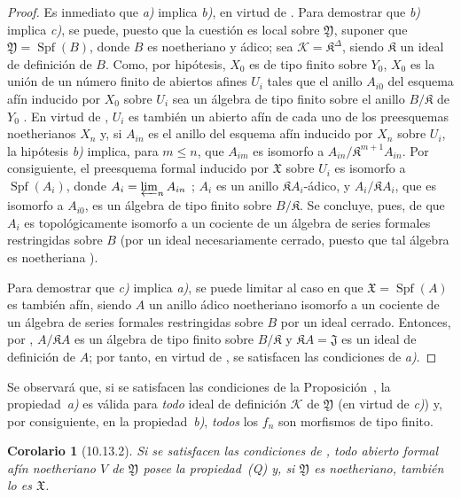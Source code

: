 \documentclass[oneside]{amsart}
\theoremstyle{ega-env-style}
\theoremstyle{ega-thm-env-style}
\newtheorem*{corollary}{Corolario}
\theoremstyle{ega-defn-env-style}
\def\leq{\leqslant}                 %
\let\EGAOriginalLabel\label
\renewcommand{\label}[1]{\phantomsection\EGAOriginalLabel{#1}}
\begin{document}
\begin{proof}
Es inmediato que \emph{a)} implica \emph{b)}, en virtud de .
Para demostrar que \emph{b)} implica \emph{c)}, se puede, puesto que la cuestión es local sobre $\mathfrak{Y}$, suponer que $\mathfrak{Y}=\operatorname{Spf}(B)$, donde $B$ es noetheriano y ádico;
sea $\mathscr{K}=\mathfrak{K}^\Delta$, siendo $\mathfrak{K}$ un ideal de definición de $B$.
Como, por hipótesis, $X_0$ es de tipo finito sobre $Y_0$, $X_0$ es la unión de un número finito de abiertos afines $U_i$ tales que el anillo $A_{i0}$ del esquema afín inducido por $X_0$ sobre $U_i$ sea un álgebra de tipo finito sobre el anillo $B/\mathfrak{K}$ de $Y_0$ .
En virtud de , $U_i$ es también un abierto afín de cada uno de los preesquemas noetherianos $X_n$ y, si $A_{in}$ es el anillo del esquema afín inducido por $X_n$ sobre $U_i$, la hipótesis \emph{b)} implica, para $m\leq n$, que $A_{im}$ es isomorfo a $A_{in}/\mathfrak{K}^{m+1}A_{in}$.
Por consiguiente, el preesquema formal inducido por $\mathfrak{X}$ sobre $U_i$ es isomorfo a $\operatorname{Spf}(A_i)$, donde $A_i=\varprojlim_n A_{in}$ ;
$A_i$ es un anillo $\mathfrak{K}A_i$-ádico, y $A_i/\mathfrak{K}A_i$, que es isomorfo a $A_{i0}$, es un álgebra de tipo finito sobre $B/\mathfrak{K}$.
Se concluye, pues, de  que $A_i$ es topológicamente isomorfo a un cociente de un álgebra de series formales restringidas sobre $B$ (por un ideal necesariamente cerrado, puesto que tal álgebra es noetheriana ).

Para demostrar que \emph{c)} implica \emph{a)}, se puede limitar al caso en que $\mathfrak{X}=\operatorname{Spf}(A)$ es también afín, siendo $A$ un anillo ádico noetheriano isomorfo a un cociente de un álgebra de series formales restringidas sobre $B$ por un ideal cerrado.
Entonces, por , $A/\mathfrak{K}A$ es un álgebra de tipo finito sobre $B/\mathfrak{K}$ y $\mathfrak{K}A=\mathfrak{J}$ es un ideal de definición de $A$; por tanto, en virtud de , se satisfacen las condiciones de \emph{a)}.
\end{proof}

Se observará que, si se satisfacen las condiciones de la Proposición~, la propiedad~\emph{a)} es válida para \emph{todo} ideal de definición $\mathscr{K}$ de $\mathfrak{Y}$ (en virtud de \emph{c)}) y, por consiguiente, en la propiedad~\emph{b)}, \emph{todos} los $f_n$ son morfismos de tipo finito.

\begin{corollary}[10.13.2]
\label{I.10.13.2}
Si se satisfacen las condiciones de , todo abierto formal afín noetheriano $V$ de $\mathfrak{Y}$ posee la propiedad~\textup{(Q)} y, si $\mathfrak{Y}$ es noetheriano, también lo es $\mathfrak{X}$.
\end{corollary}
\end{document}
